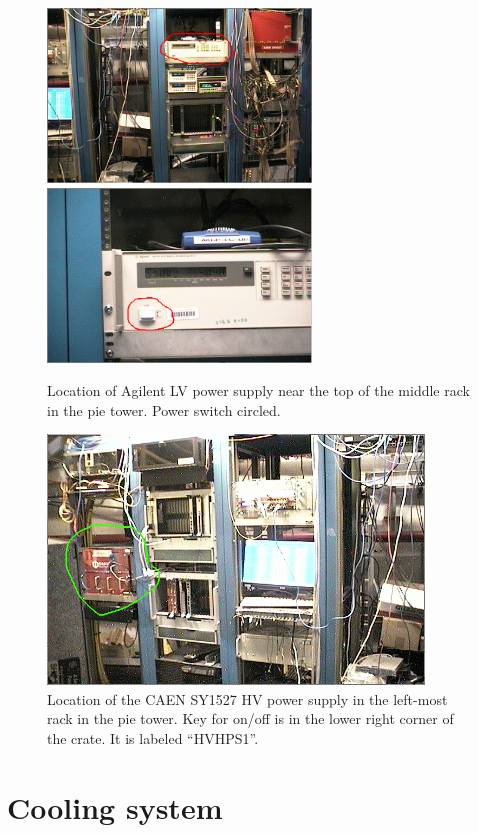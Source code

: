 \documentclass[12pt]{article}
\begin{document}
{\begin{figure}[htbp]\centering
    \includegraphics[width=7cm]{pics/ECALLVPHOTO2.png}
    \includegraphics[width=7cm]{pics/ECALLVPHOTO.png}
    \caption{Location of Agilent LV power supply near the top of the middle rack in the pie tower.  Power switch circled.\label{fig:LVPHOTO}}
\end{figure}
\begin{figure}[htbp]\centering
    \includegraphics[width=10cm]{pics/ECALHVPHOTO.png}
    \caption{Location of the CAEN SY1527 HV power supply in the left-most rack in the pie tower.  Key for on/off is in the lower right corner of the crate.  It is labeled ``HVHPS1''. \label{fig:HVPHOTO}}
\end{figure}

   \section{Cooling system}

}
\end{document}
